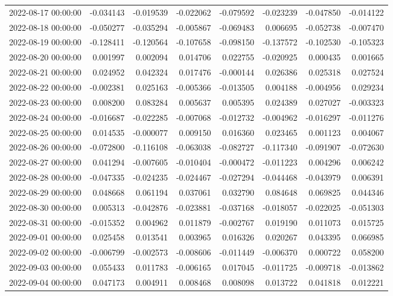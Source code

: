 \begin{tabular}{lrrrrrrr}
2022-08-17 00:00:00 & -0.034143 & -0.019539 & -0.022062 & -0.079592 & -0.023239 & -0.047850 & -0.014122 \\
2022-08-18 00:00:00 & -0.050277 & -0.035294 & -0.005867 & -0.069483 & 0.006695 & -0.052738 & -0.007470 \\
2022-08-19 00:00:00 & -0.128411 & -0.120564 & -0.107658 & -0.098150 & -0.137572 & -0.102530 & -0.105323 \\
2022-08-20 00:00:00 & 0.001997 & 0.002094 & 0.014706 & 0.022755 & -0.020925 & 0.000435 & 0.001665 \\
2022-08-21 00:00:00 & 0.024952 & 0.042324 & 0.017476 & -0.000144 & 0.026386 & 0.025318 & 0.027524 \\
2022-08-22 00:00:00 & -0.002381 & 0.025163 & -0.005366 & -0.013505 & 0.004188 & -0.004956 & 0.029234 \\
2022-08-23 00:00:00 & 0.008200 & 0.083284 & 0.005637 & 0.005395 & 0.024389 & 0.027027 & -0.003323 \\
2022-08-24 00:00:00 & -0.016687 & -0.022285 & -0.007068 & -0.012732 & -0.004962 & -0.016297 & -0.011276 \\
2022-08-25 00:00:00 & 0.014535 & -0.000077 & 0.009150 & 0.016360 & 0.023465 & 0.001123 & 0.004067 \\
2022-08-26 00:00:00 & -0.072800 & -0.116108 & -0.063038 & -0.082727 & -0.117340 & -0.091907 & -0.072630 \\
2022-08-27 00:00:00 & 0.041294 & -0.007605 & -0.010404 & -0.000472 & -0.011223 & 0.004296 & 0.006242 \\
2022-08-28 00:00:00 & -0.047335 & -0.024235 & -0.024467 & -0.027294 & -0.044468 & -0.043979 & 0.006391 \\
2022-08-29 00:00:00 & 0.048668 & 0.061194 & 0.037061 & 0.032790 & 0.084648 & 0.069825 & 0.044346 \\
2022-08-30 00:00:00 & 0.005313 & -0.042876 & -0.023881 & -0.037168 & -0.018057 & -0.022025 & -0.051303 \\
2022-08-31 00:00:00 & -0.015352 & 0.004962 & 0.011879 & -0.002767 & 0.019190 & 0.011073 & 0.015725 \\
2022-09-01 00:00:00 & 0.025458 & 0.013541 & 0.003965 & 0.016326 & 0.020267 & 0.043395 & 0.066985 \\
2022-09-02 00:00:00 & -0.006799 & -0.002573 & -0.008606 & -0.011449 & -0.006370 & 0.000722 & 0.058200 \\
2022-09-03 00:00:00 & 0.055433 & 0.011783 & -0.006165 & 0.017045 & -0.011725 & -0.009718 & -0.013862 \\
2022-09-04 00:00:00 & 0.047173 & 0.004911 & 0.008468 & 0.008098 & 0.013722 & 0.041818 & 0.012221 \\

\end{tabular}

